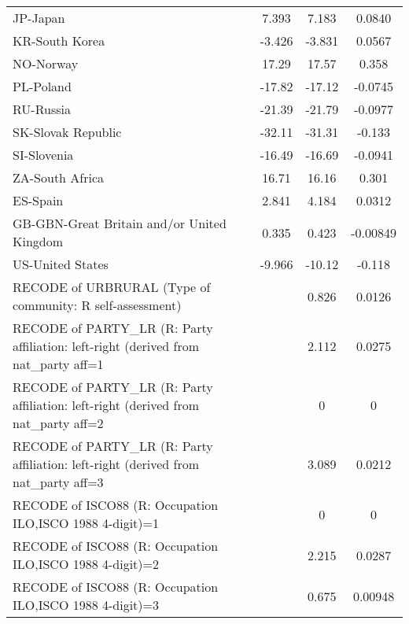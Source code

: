 \begin{table}[htbp]
\begin{tabular}{l*{3}{c}}
JP-Japan            &       7.393\sym{***}&       7.183\sym{***}&      0.0840\sym{***}\\
KR-South Korea      &      -3.426\sym{**} &      -3.831\sym{**} &      0.0567\sym{***}\\
NO-Norway           &       17.29\sym{***}&       17.57\sym{***}&       0.358\sym{***}\\
PL-Poland           &      -17.82\sym{***}&      -17.12\sym{***}&     -0.0745\sym{***}\\
RU-Russia           &      -21.39\sym{***}&      -21.79\sym{***}&     -0.0977\sym{***}\\
SK-Slovak Republic  &      -32.11\sym{***}&      -31.31\sym{***}&      -0.133\sym{***}\\
SI-Slovenia         &      -16.49\sym{***}&      -16.69\sym{***}&     -0.0941\sym{***}\\
ZA-South Africa     &       16.71\sym{***}&       16.16\sym{***}&       0.301\sym{***}\\
ES-Spain            &       2.841         &       4.184\sym{*}  &      0.0312         \\
GB-GBN-Great Britain and/or United Kingdom&       0.335         &       0.423         &    -0.00849         \\
US-United States    &      -9.966\sym{***}&      -10.12\sym{***}&      -0.118\sym{***}\\
RECODE of URBRURAL (Type of community: R self-assessment)&                     &       0.826         &      0.0126         \\
RECODE of PARTY\_LR (R: Party affiliation: left-right (derived from nat\_party aff=1&                     &       2.112\sym{**} &      0.0275\sym{**} \\
RECODE of PARTY\_LR (R: Party affiliation: left-right (derived from nat\_party aff=2&                     &           0         &           0         \\
RECODE of PARTY\_LR (R: Party affiliation: left-right (derived from nat\_party aff=3&                     &       3.089\sym{***}&      0.0212\sym{*}  \\
RECODE of ISCO88 (R: Occupation ILO,ISCO 1988 4-digit)=1&                     &           0         &           0         \\
RECODE of ISCO88 (R: Occupation ILO,ISCO 1988 4-digit)=2&                     &       2.215\sym{*}  &      0.0287\sym{*}  \\
RECODE of ISCO88 (R: Occupation ILO,ISCO 1988 4-digit)=3&                     &       0.675         &     0.00948         \\

\end{tabular}
\end{table}
